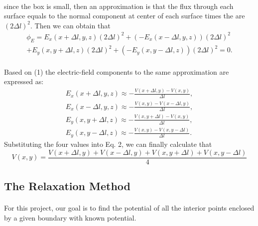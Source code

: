 \documentclass[12pt]{report}
\begin{document}
\paragraph{}since the box is small, then an approximation is that the flux through each surface equals to the normal component at center of each surface times the are $(2\Delta l)^2$. Then we can obtain that
\begin{equation}
\begin{split}
    \phi_{E}=E_{x}(x+\Delta l,y,z)(2\Delta l)^2+(-E_{x}(x-\Delta l,y,z))(2\Delta l)^2\\
    +E_{y}(x,y+\Delta l,z)(2\Delta l)^2+(-E_{y}(x,y-\Delta l,z))(2\Delta l)^2=0.
\end{split}
\end{equation}
\paragraph{}Based on (1) the electric-field components to the same approximation are expressed as:
\begin{equation}
    \begin{split}
        E_{x}(x+\Delta l,y,z)\approx -\frac{V(x+\Delta l,y)-V(x,y)}{\Delta l},\\
        E_{x}(x-\Delta l,y,z)\approx -\frac{V(x,y)-V(x-\Delta l,y)}{\Delta l},\\
        E_{y}(x,y+\Delta l,z)\approx -\frac{V(x,y+\Delta l)-V(x,y)}{\Delta l},\\
        E_{y}(x,y-\Delta l,z)\approx -\frac{V(x,y)-V(x,y-\Delta l)}{\Delta l}.
    \end{split}
\end{equation}
Substituting the four values into Eq. 2, we can finally calculate that
\begin{equation}
    V(x,y)=\frac{V(x+\Delta l,y)+V(x-\Delta l,y)+V(x,y+\Delta l)+V(x,y-\Delta l)}{4}
\end{equation}
\subsection{The Relaxation Method}
\paragraph{}For this project, our goal is to find the potential of all the interior points enclosed by a given boundary with known potential. 
\end{document}
